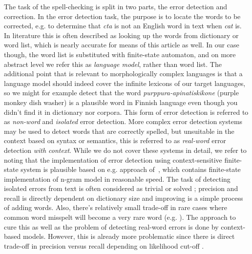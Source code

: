 \documentclass[a4paper,12pt]{article}
\begin{document}
The task of the spell-checking is split in two parts, the error detection and
correction. In the error detection task, the purpose is to locate the words to
be corrected, e.g. to determine that \emph{cta} is not an English word in text
when \emph{cat} is. In literature this is often described as looking up the
words from dictionary or word list, which is nearly accurate for means of this
article as well. In our case though, the word list is substituted with
finite-state automaton, and on more abstract level we refer this as
\emph{language model}, rather than word list. The additional point that is
relevant to morphologically complex languages is that a language model should
indeed cover the infinite lexicons of our target languages, so we might for
example detect that the word \emph{purppura-apinatiskikone} (purple monkey dish
washer) is a plausible word in Finnish language even though you didn't find it
in dictionary nor corpora.  This form of error detection is referred to as
\emph{non-word} and \emph{isolated} error detection. More complex error
detection systems may be used to detect words that are correctly spelled, but
unsuitable in the context based on syntax or semantics, this is referred to as
\emph{real-word} error detection \emph{with context}. While we do not cover
these systems in detail, we refer to \cite{mays/1991} noting that the
implementation of error detection using context-sensitive finite-state system
is plausible based on e.g. approach of~\cite{silfverberg/2010}, which contains
finite-state implementation of n-gram model in reasonable speed. The task of
detecting isolated errors from text is often considered as trivial or solved
\cite[e.g.][]{otero/2007}; precision and recall is directly dependent on
dictionary size and improving is a simple process of adding words.  Also,
there's relatively small trade-off in rare cases where common word misspelt
will become a very rare word (e.g. ). The
approach to cure this as well as the problem of detecting real-word errors is
done by context-based models. However, this is already more problematic since
there is direct trade-off in precision versus recall depending on likelihood
cut-off \cite[]{hirst2008evaluation,wilcoxohearn2008realword}.
\end{document}
